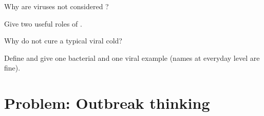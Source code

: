 \begin{exercise}[$\star$]\label{exo:g8:microbiology:2}
Why are viruses not considered ?
\end{exercise}

\begin{exercise}[$\star$]\label{exo:g8:microbiology:3}
Give two useful roles of .
\end{exercise}

\begin{exercise}[$\star$]\label{exo:g8:microbiology:4}
Why do  not cure a typical viral cold?
\end{exercise}

\begin{exercise}[$\star$]\label{exo:g8:microbiology:5}
Define  and give one bacterial and one viral example (names at
everyday level are fine).
\end{exercise}

\section{Problem: Outbreak thinking}

